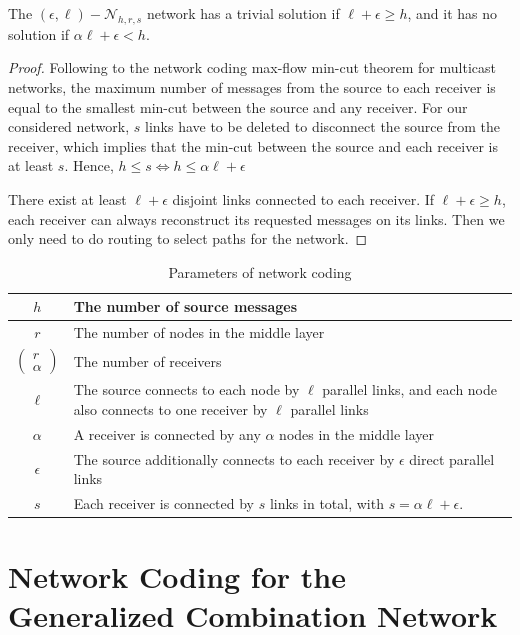 \begin{thm}
\label{nw_parameters}The $(\epsilon,\ell)-\mathcal{N}_{h,r,s}$
network has a trivial solution if $\ell+\epsilon\geq h$, and it has
no solution if $\alpha\ell+\epsilon<h$.
\end{thm}
\begin{proof}
Following to the network coding max-flow min-cut theorem for multicast
networks, the maximum number of messages from the source to each receiver
is equal to the smallest min-cut between the source and any receiver.
For our considered network, $s$ links have to be deleted to disconnect
the source from the receiver, which implies that the min-cut between
the source and each receiver is at least $s$. Hence, $h\leq s\Leftrightarrow h\leq\alpha\ell+\epsilon$ 

There exist at least $\ell+\epsilon$ disjoint links connected to
each receiver. If $\ell+\epsilon\geq h$, each receiver can always
reconstruct its requested messages on its links. Then we only need
to do routing to select paths for the network.
\end{proof}
\begin{table}[H]
\caption{Parameters of network coding \label{tab:Parameters-of-network}}

\centering{}%
\begin{tabular}{|c|>{\centering}p{0.48\paperwidth}|}
\hline 
$h$ & The number of source messages\tabularnewline
\hline 
$r$ & The number of nodes in the middle layer\tabularnewline
\hline 
$\left(\begin{array}{c}
r\\
\alpha
\end{array}\right)$ & The number of receivers\tabularnewline
\hline 
$\ell$ & The source connects to each node by $\ell$ parallel links, and each
node also connects to one receiver by $\ell$ parallel links\tabularnewline
\hline 
$\alpha$ & A receiver is connected by any $\alpha$ nodes in the middle layer\tabularnewline
\hline 
$\epsilon$ & The source additionally connects to each receiver by $\epsilon$ direct
parallel links\tabularnewline
\hline 
$s$ & Each receiver is connected by $s$ links in total, with $s=\alpha\ell+\epsilon$.\tabularnewline
\hline 
\end{tabular}
\end{table}


\section{Network Coding for the Generalized Combination Network \label{sec:Network-Coding-for-GCN}}


